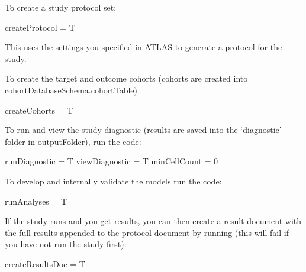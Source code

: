 \documentclass[
]{article}
\newenvironment{Shaded}{\begin{snugshade}}{\end{snugshade}}
\newcommand{\DecValTok}[1]{\textcolor[rgb]{0.00,0.00,0.81}{#1}}
\newcommand{\NormalTok}[1]{#1}
\newcommand{\StringTok}[1]{\textcolor[rgb]{0.31,0.60,0.02}{#1}}
\begin{document}
To create a study protocol set:

\begin{Shaded}
\begin{Highlighting}[]
\NormalTok{    createProtocol =}\StringTok{ }\NormalTok{T}
\end{Highlighting}
\end{Shaded}

This uses the settings you specified in ATLAS to generate a protocol for
the study.

To create the target and outcome cohorts (cohorts are created into
cohortDatabaseSchema.cohortTable)

\begin{Shaded}
\begin{Highlighting}[]
\NormalTok{    createCohorts =}\StringTok{ }\NormalTok{T}
\end{Highlighting}
\end{Shaded}

To run and view the study diagnostic (results are saved into the
`diagnostic' folder in outputFolder), run the code:

\begin{Shaded}
\begin{Highlighting}[]
\NormalTok{    runDiagnostic =}\StringTok{ }\NormalTok{T}
\NormalTok{    viewDiagnostic =}\StringTok{ }\NormalTok{T}
\NormalTok{    minCellCount =}\StringTok{ }\DecValTok{0}
\end{Highlighting}
\end{Shaded}

To develop and internally validate the models run the code:

\begin{Shaded}
\begin{Highlighting}[]
\NormalTok{    runAnalyses =}\StringTok{ }\NormalTok{T}
\end{Highlighting}
\end{Shaded}

If the study runs and you get results, you can then create a result
document with the full results appended to the protocol document by
running (this will fail if you have not run the study first):

\begin{Shaded}
\begin{Highlighting}[]
\NormalTok{    createResultsDoc =}\StringTok{ }\NormalTok{T}
\end{Highlighting}
\end{Shaded}
\end{document}
